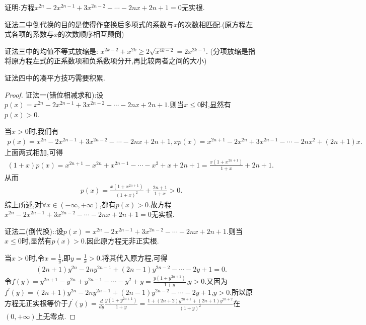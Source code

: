 \documentclass[lang=cn,newtx,10pt,scheme=chinese]{../Template/elegantbook}
\begin{document}
\begin{exercise}
    证明:方程\(x^{2n}-2x^{2n - 1}+3x^{2n - 2}-\cdots - 2nx + 2n + 1 = 0\)无实根.
\end{exercise}
\begin{note}\label{note:1.1111}
    {\color{blue}证法二}中倒代换的目的是使得作变换后多项式的系数与$x$的次数相匹配.(原方程左式各项的系数与$x$的次数顺序相互颠倒)

    {\color{blue}证法三}中的均值不等式放缩是:
    $x^{2k-2}+x^{2k}\geq 2\sqrt{x^{4k-2}}=2x^{2k-1}$.
    (分项放缩是指将原方程左式的正系数项和负系数项分开,再比较两者之间的大小)

    {\color{blue}证法四}中的凑平方技巧需要积累.
\end{note}
\begin{proof}
    {\color{blue}证法一(错位相减求和):}设\(p(x) = x^{2n} - 2x^{2n - 1} + 3x^{2n - 2} - \cdots - 2nx + 2n + 1\).则当\(x \leq 0\)时,显然有\(p(x) > 0\).

    当\(x > 0\)时,我们有
    \begin{align*}
        p(x) = x^{2n} - 2x^{2n - 1} + 3x^{2n - 2} - \cdots - 2nx + 2n + 1,
    xp(x) = x^{2n + 1} - 2x^{2n} + 3x^{2n - 1} - \cdots - 2nx^2 + (2n + 1)x.
    \end{align*}
    上面两式相加,可得
    \begin{align*}
        (1 + x)p(x) = x^{2n + 1} - x^{2n} + x^{2n - 1} - \cdots - x^2 + x + 2n + 1 = \frac{x(1 + x^{2n + 1})}{1 + x} + 2n + 1.
    \end{align*}
    从而
    \begin{align*}
        p(x) = \frac{x(1 + x^{2n + 1})}{(1 + x)^2} + \frac{2n + 1}{1 + x} > 0.
    \end{align*}
    综上所述,对\(\forall x\in (-\infty, +\infty)\),都有\(p(x) > 0\).故方程\(x^{2n} - 2x^{2n - 1} + 3x^{2n - 2} - \cdots - 2nx + 2n + 1 = 0\)无实根.
    
    {\color{blue}证法二(倒代换):}:设\(p(x) = x^{2n} - 2x^{2n - 1} + 3x^{2n - 2} - \cdots - 2nx + 2n + 1\).则当\(x \leq 0\)时,显然有\(p(x) > 0\).因此原方程无非正实根.
    
    当\(x > 0\)时,令\(x = \frac{1}{y}\),即\(y = \frac{1}{x} > 0\).将其代入原方程,可得
    \begin{align*}
      (2n + 1)y^{2n} - 2ny^{2n - 1} + (2n - 1)y^{2n - 2} - \cdots - 2y + 1 = 0 .
    \end{align*}
    令\(f(y) = y^{2n + 1} - y^{2n} + y^{2n - 1} - \cdots - y^2 + y = \frac{y(1 + y^{2n + 1})}{1 + y}\),\(y > 0\).又因为\(f^{\prime}(y) = (2n + 1)y^{2n} - 2ny^{2n - 1} + (2n - 1)y^{2n - 2} - \cdots - 2y + 1\),\(y > 0\).所以原方程无正实根等价于\(f^{\prime}(y) = \frac{d}{dy}\frac{y(1 + y^{2n + 1})}{1 + y} = \frac{1 + (2n + 2)y^{2n + 1} + (2n + 1)y^{2n + 2}}{(1 + y)^2}\)在\((0, +\infty)\)上无零点.
    

\end{proof}
\end{document}
